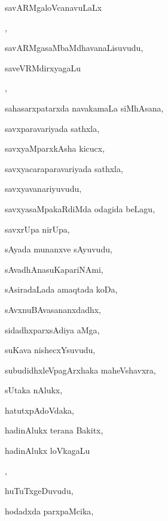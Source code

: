 \begin{multicols}{3}
{\noindent
{savARMgaloVcanavuLaLx} 

\noindent
{}, \pageref{savARMgaloVcanavuLaLx jaMgama}

\noindent
{savARMgasaMbaMdhavanaLisuvudu}, \pageref{savARMgasaMbaMdhavanaLisuvudu}

\noindent
{saveVRMdirxyagaLu}

\noindent
{}, \pageref{saveVRMdirxyagaLu EkeVMdirxyavAguvudu}

\noindent
{sahasarxpatarxda navakamaLa siMhAsana}, \pageref{sahasarxpatarxda navakamaLa siMhAsana}

\noindent
{savxparavariyada sathxla}, \pageref{savxparavariyada sathxla}

\noindent
{savxyaMparxkAsha kicucx}, \pageref{savxyaMparxkAsha kicucx}

\noindent
{savxyacaraparavariyada sathxla}, \pageref{savxyacaraparavariyada sathxla}

\noindent
{savxyavanariyuvudu}, \pageref{savxyavanariyuvudu}

\noindent
{savxyasaMpakaRdiMda odagida beLagu}, \pageref{savxyasaMpakaRdiMda odagida beLagu}

\noindent
{savxrUpa nirUpa}, \pageref{savxrUpa nirUpa}

\noindent
{sAyada munanxve sAyuvudu}, \pageref{sAyada munanxve sAyuvudu}

\noindent
{sAvadhAnasuKapariNAmi}, \pageref{sAvadhAnasuKapariNAmi}

\noindent
{sAsiradaLada amaqtada koDa}, \pageref{sAsiradaLada amaqtada koDa}

\noindent
{sAvxnuBAvasananxdadhx}, \pageref{sAvxnuBAvasananxdadhx}

\noindent
{sidadhxparxsAdiya aMga}, \pageref{sidadhxparxsAdiya aMga}

\noindent
{suKava nishecxYsuvudu}, \pageref{suKava nishecxYsuvudu}

\noindent
{subudidhxleVpagArxhaka maheVshavxra}, \pageref{subudidhxleVpagArxhaka maheVshavxra}

\noindent
{sUtaka nAlukx}, \pageref{sUtaka nAlukx}

\noindent
{hatutxpAdoVdaka}, \pageref{hatutxpAdoVdaka}

\noindent
{hadinAlukx terana Bakitx}, \pageref{hadinAlukx terana Bakitx}

\noindent
{hadinAlukx loVkagaLu} 

\noindent
{}, \pageref{hadinAlukx loVkagaLu (IreVLu loVka)}

\noindent
{huTuTxgeDuvudu}, \pageref{huTuTxgeDuvudu}

\noindent
{hodadxda parxpaMcika}, \pageref{hodadxda parxpaMcika}
}
\end{multicols}
